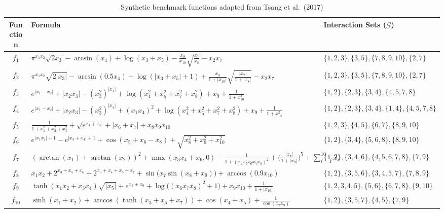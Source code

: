 \documentclass{article}
\begin{document}
\begin{table}[ht]
\centering
\begin{threeparttable}
\caption{Synthetic benchmark functions adapted from Tsang et al.\ (2017)}
\label{tab:synthetic_functions}
\footnotesize
\renewcommand{\arraystretch}{1.1}
\setlength{\tabcolsep}{4pt}
\begin{tabularx}{\textwidth}{@{}c >{\raggedright\arraybackslash}X >{\raggedright\arraybackslash}p{4.2cm}@{}}
\toprule
\textbf{Function} & \textbf{Formula} & \textbf{Interaction Sets ($\mathcal{G}$)} \\
\midrule
$f_1$ &
$\pi^{x_1 x_2}\!\sqrt{2x_3} - \arcsin(x_4) + \log(x_3+x_5) - \tfrac{x_9}{x_{10}}\!\sqrt{\tfrac{x_7}{x_8}} - x_2 x_7$ &
$\{1,2,3\}, \{3,5\}, \{7,8,9,10\}, \{2,7\}$ \\[4pt]
$f_2$ &
$\pi^{x_1 x_2}\!\sqrt{2|x_3|} - \arcsin(0.5x_4) + \log(|x_3+x_5|+1) + \tfrac{x_9}{1+|x_{10}|}\!\sqrt{\tfrac{|x_7|}{1+|x_8|}} - x_2 x_7$ &
$\{1,2,3\}, \{3,5\}, \{7,8,9,10\}, \{2,7\}$ \\[4pt]
$f_3$ &
$e^{|x_1-x_2|} + |x_2 x_3| - (x_3^2)^{|x_4|} + \log(x_4^2+x_5^2+x_7^2+x_8^2) + x_9 + \tfrac{1}{1+x_{10}^2}$ &
$\{1,2\}, \{2,3\}, \{3,4\}, \{4,5,7,8\}$ \\[4pt]
$f_4$ &
$e^{|x_1-x_2|} + |x_2 x_3| - (x_3^2)^{|x_4|} + (x_1 x_4)^2 + \log(x_4^2+x_5^2+x_7^2+x_8^2) + x_9 + \tfrac{1}{1+x_{10}^2}$ &
$\{1,2\}, \{2,3\}, \{3,4\}, \{1,4\}, \{4,5,7,8\}$ \\[4pt]
$f_5$ &
$\tfrac{1}{1+x_1^2+x_2^2+x_3^2} + \sqrt{e^{x_4+x_5}} + |x_6+x_7| + x_8 x_9 x_{10}$ &
$\{1,2,3\}, \{4,5\}, \{6,7\}, \{8,9,10\}$ \\[4pt]
$f_6$ &
$e^{|x_1 x_2|+1} - e^{|x_3+x_4|+1} + \cos(x_5+x_6-x_8) + \sqrt{x_8^2+x_9^2+x_{10}^2}$ &
$\{1,2\}, \{3,4\}, \{5,6,8\}, \{8,9,10\}$ \\[4pt]
$f_7$ &
$(\arctan(x_1)+\arctan(x_2))^2 + \max(x_3 x_4+x_6,0) - \tfrac{1}{1+(x_4 x_5 x_6 x_7 x_8)^2} + \bigl(\tfrac{|x_7|}{1+|x_9|}\bigr)^{\!5} + \sum_{i=1}^{10}x_i$ &
$\{1,2\}, \{3,4,6\}, \{4,5,6,7,8\}, \{7,9\}$ \\[4pt]
$f_8$ &
$x_1 x_2 + 2^{x_3+x_5+x_6} + 2^{x_3+x_4+x_5+x_7} + \sin\!\bigl(x_7\sin(x_8+x_9)\bigr) + \arccos(0.9x_{10})$ &
$\{1,2\}, \{3,5,6\}, \{3,4,5,7\}, \{7,8,9\}$ \\[4pt]
$f_9$ &
$\tanh(x_1 x_2+x_3 x_4)\sqrt{|x_5|} + e^{x_5+x_6} + \log\!\bigl((x_6 x_7 x_8)^2+1\bigr) + x_9 x_{10} + \tfrac{1}{1+|x_{10}|}$ &
$\{1,2,3,4,5\}, \{5,6\}, \{6,7,8\}, \{9,10\}$ \\[4pt]
$f_{10}$ &
$\sinh(x_1+x_2) + \arccos(\tanh(x_3+x_5+x_7)) + \cos(x_4+x_5) + \tfrac{1}{\cos(x_7 x_9)}$ &
$\{1,2\}, \{3,5,7\}, \{4,5\}, \{7,9\}$ \\
\bottomrule
\end{tabularx}
\end{threeparttable}
\end{table}
\end{document}

